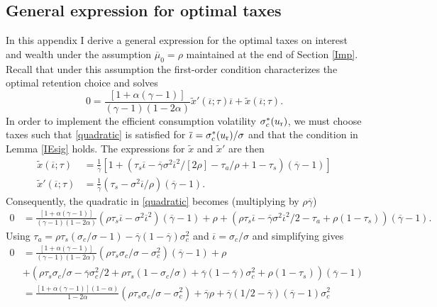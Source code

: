 \documentclass[11pt]{article}
\theoremstyle{plain}
\begin{document}
\subsection{General expression for optimal taxes} \label{genFOC}

In this appendix I derive a general expression for the optimal taxes on interest and wealth under the assumption $\overline{\mu}_0 = \rho$ maintained at the end of Section \ref{Imp}. Recall that under this assumption the first-order condition characterizes the optimal retention choice and solves %
$$
0 = \frac{[1 + \alpha(\gamma-1)]}{(\gamma-1)(1 - 2\alpha)}\tilde{x}'(\overline{\iota};\tau)\overline{\iota} + \tilde{x}(\overline{\iota};\tau).
$$
In order to implement the efficient consumption volatility $\sigma_c^*(u_{\textnormal{r}})$, we must choose taxes such that \eqref{quadratic} is satisfied for $\overline{\iota} = \sigma_c^*(u_{\textnormal{r}})/\sigma$ and that the condition in Lemma \ref{IEsig} holds. The expressions for $\tilde{x}$ and $\tilde{x}'$ are then 
\begin{align*}
\tilde{x}(\overline{\iota}; \tau) & = \frac{1}{\overline{\gamma}}{\left[1 + {\left(\tau_s\overline{\iota} - \overline{\gamma}\sigma^2\overline{\iota}^2/[2\rho] -\tau_a/\rho + 1-\tau_s\right)}(\overline{\gamma}-1)\right]}
\\ \tilde{x}'(\overline{\iota}; \tau) & = \frac{1}{\overline{\gamma}}{\left(\tau_s - \sigma^2\overline{\iota}/\rho\right)}(\overline{\gamma}-1).
\end{align*}
Consequently, the quadratic in \eqref{quadratic} becomes (multiplying by $\rho\overline{\gamma}$)
\begin{align*}
0 & = \frac{[1 + \alpha(\gamma-1)]}{(\gamma-1)(1 - 2\alpha)}{\left(\rho \tau_s\overline{\iota} - \sigma^2\overline{\iota}^2\right)}(\overline{\gamma}-1)
 + \rho + {\left(\rho\tau_s\overline{\iota} - \overline{\gamma}\sigma^2\overline{\iota}^2/2 -\tau_a + \rho(1-\tau_s)\right)}(\overline{\gamma}-1).
\end{align*}
Using $\tau_a = \rho\tau_s(\sigma_c/\sigma - 1) - \overline{\gamma}(1-\overline{\gamma}) \sigma_c^2$ and $\overline{\iota} = \sigma_c/\sigma$ and simplifying gives
\begin{align*}
0 & = \frac{[1 + \alpha(\gamma-1)]}{(\gamma-1)(1 - 2\alpha)}{\left(\rho \tau_s \sigma_c/\sigma - \sigma_c^2\right)}(\overline{\gamma}-1) + \rho
\\ & + {\left(\rho\tau_s\sigma_c/\sigma - \overline{\gamma}\sigma_c^2/2 + \rho\tau_s(1-\sigma_c/\sigma) + \overline{\gamma}(1-\overline{\gamma}) \sigma_c^2 + \rho(1-\tau_s)\right)}(\overline{\gamma}-1)
\\ & = \frac{[1 + \alpha(\gamma-1)](1-\alpha)}{1 - 2\alpha}{\left(\rho \tau_s \sigma_c/\sigma - \sigma_c^2\right)} + \overline{\gamma}\rho + \overline{\gamma}(1/2-\overline{\gamma}) (\overline{\gamma}-1) \sigma_c^2
\end{align*}
\end{document}
